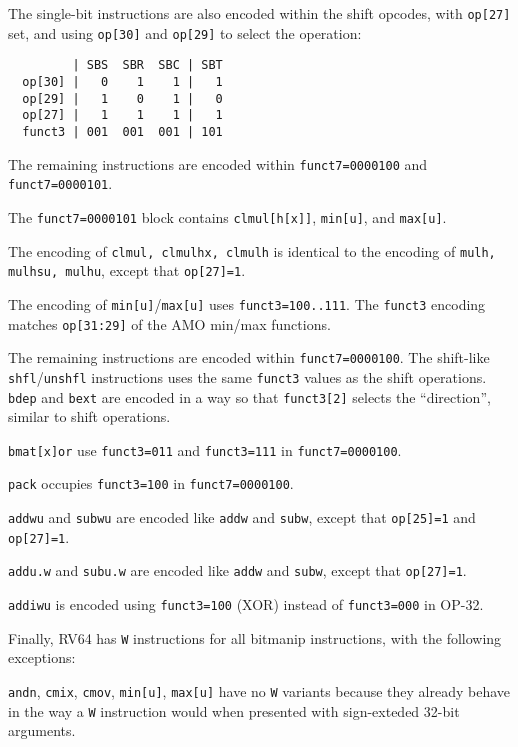 The single-bit instructions are also encoded within the shift opcodes, with
{\tt op[27]} set, and using {\tt op[30]} and {\tt op[29]} to select the operation:

\begin{minipage}{\linewidth}
\begin{verbatim}
         | SBS  SBR  SBC | SBT
  op[30] |   0    1    1 |   1
  op[29] |   1    0    1 |   0
  op[27] |   1    1    1 |   1
  funct3 | 001  001  001 | 101
\end{verbatim}
\end{minipage}

The remaining instructions are encoded within {\tt funct7=0000100} and
{\tt funct7=0000101}.

The {\tt funct7=0000101} block contains {\tt clmul[h[x]]},
{\tt min[u]}, and {\tt max[u]}.

The encoding of {\tt clmul, clmulhx, clmulh} is identical to the encoding of
{\tt mulh, mulhsu, mulhu}, except that {\tt op[27]=1}.

The encoding of {\tt min[u]}/{\tt max[u]} uses {\tt funct3=100..111}. The
{\tt funct3} encoding matches {\tt op[31:29]} of the AMO min/max functions.

The remaining instructions are encoded within {\tt funct7=0000100}. The
shift-like {\tt shfl}/{\tt unshfl} instructions uses the same {\tt funct3}
values as the shift operations. {\tt bdep} and {\tt bext} are encoded in a
way so that {\tt funct3[2]} selects the ``direction'', similar to shift
operations.

{\tt bmat[x]or} use {\tt funct3=011} and {\tt funct3=111} in {\tt funct7=0000100}.

{\tt pack} occupies {\tt funct3=100} in {\tt funct7=0000100}.

{\tt addwu} and {\tt subwu} are encoded like {\tt addw} and {\tt subw}, except
that {\tt op[25]=1} and {\tt op[27]=1}.

{\tt addu.w} and {\tt subu.w} are encoded like {\tt addw} and {\tt subw}, except
that {\tt op[27]=1}.

{\tt addiwu} is encoded using {\tt funct3=100} (XOR) instead of {\tt funct3=000} in OP-32.

Finally, RV64 has {\tt *W} instructions for all bitmanip instructions, with the
following exceptions:

{\tt andn}, {\tt cmix}, {\tt cmov}, {\tt min[u]}, {\tt max[u]} have no {\tt *W}
variants because they already behave in the way a {\tt *W} instruction would
when presented with sign-exteded 32-bit arguments.

